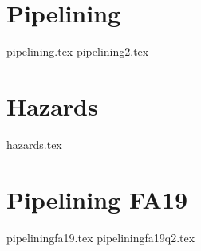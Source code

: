 \documentclass[11pt]{exam}
\begin{document}
\section{Pipelining}
\begin{questions}
{pipelining.tex}
{pipelining2.tex}
\end{questions}
\newpage



\section{Hazards}
\begin{questions}
{hazards.tex}
\end{questions}
\newpage

\section{Pipelining FA19}
\begin{questions}
{pipeliningfa19.tex}
{pipeliningfa19q2.tex}
\end{questions}
\newpage
\end{document}
